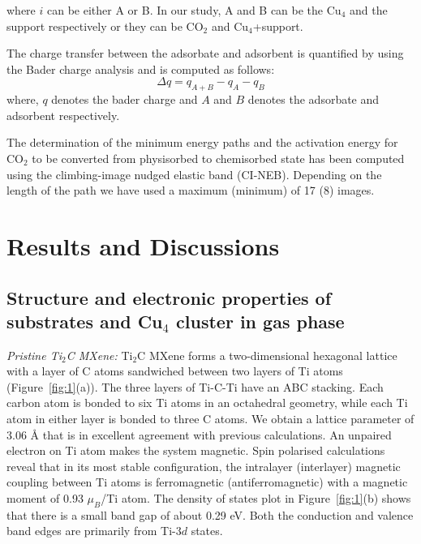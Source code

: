 \noindent where $i$ can be either A or B. In our study, A and B can be the Cu$_4$ and the support
respectively or they can be CO$_2$ and Cu$_4$+support.

The charge transfer between the adsorbate and adsorbent is quantified by using the Bader charge analysis and is computed as follows:
  \begin{equation}
     \Delta {q} =  q_{A+B} - q_{A} - q_{B}
   \label{charge}
  \end{equation}
where, $q$ denotes the bader charge and $A$ and $B$ denotes the adsorbate and adsorbent
respectively.

The determination of the minimum energy paths and the activation energy for CO$_2$ to be converted from physisorbed to chemisorbed state has been
computed using the climbing-image nudged elastic band (CI-NEB). Depending on the length of the path
we have used a maximum (minimum) of 17 (8) images.

\section{Results and Discussions}
\label{resultsss}
  \subsection{Structure and electronic properties of substrates and Cu\texorpdfstring{$_4$}{} cluster in gas phase}
  
  \noindent \textit{Pristine Ti$_{2}$C MXene:} 
  Ti$_2$C MXene forms a two-dimensional hexagonal lattice with a layer of C atoms sandwiched between two layers of Ti atoms (Figure~\ref{fig:1}(a))\cite{khazaei2013novel}\cite{naguib2012two}. The three layers of Ti-C-Ti have an ABC stacking. Each carbon atom is bonded to six Ti atoms in an octahedral geometry, while each Ti atom in either layer is bonded to three C atoms. We obtain a lattice parameter of 3.06 {\AA} that is in excellent agreement with previous calculations\cite{gan2013first}\cite{gao2016monolayer}. An unpaired electron on Ti atom makes the system magnetic. Spin polarised calculations reveal that
  in its most stable configuration, the intralayer (interlayer) magnetic coupling between Ti atoms is ferromagnetic (antiferromagnetic) with a magnetic moment of 0.93 $\mu_B$/Ti atom. The   density of states plot in Figure~\ref{fig:1}(b) shows that there is a small band gap of   about 0.29 eV. Both the conduction and valence band edges are primarily from Ti-$3d$ states.

